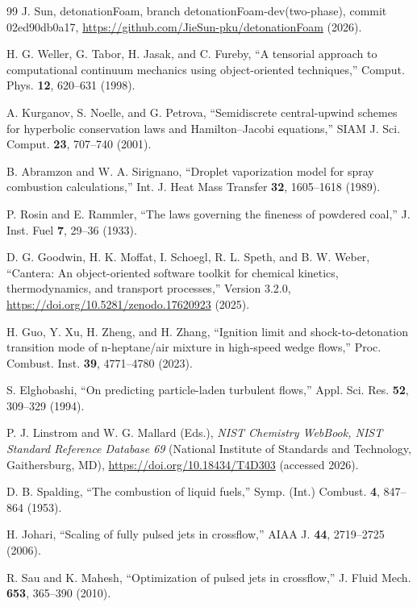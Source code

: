 \documentclass[aip,pof,preprint,amsmath,amssymb]{revtex4-2}
\begin{document}
\begin{thebibliography}{99}
 J. Sun, detonationFoam, branch detonationFoam-dev(two-phase), commit 02ed90db0a17, \url{https://github.com/JieSun-pku/detonationFoam} (2026).

 H. G. Weller, G. Tabor, H. Jasak, and C. Fureby, ``A tensorial approach to computational continuum mechanics using object-oriented techniques,'' Comput. Phys. \textbf{12}, 620--631 (1998).

 A. Kurganov, S. Noelle, and G. Petrova, ``Semidiscrete central-upwind schemes for hyperbolic conservation laws and Hamilton--Jacobi equations,'' SIAM J. Sci. Comput. \textbf{23}, 707--740 (2001).

 B. Abramzon and W. A. Sirignano, ``Droplet vaporization model for spray combustion calculations,'' Int. J. Heat Mass Transfer \textbf{32}, 1605--1618 (1989).

 P. Rosin and E. Rammler, ``The laws governing the fineness of powdered coal,'' J. Inst. Fuel \textbf{7}, 29--36 (1933).

 D. G. Goodwin, H. K. Moffat, I. Schoegl, R. L. Speth, and B. W. Weber, ``Cantera: An object-oriented software toolkit for chemical kinetics, thermodynamics, and transport processes,'' Version 3.2.0, \url{https://doi.org/10.5281/zenodo.17620923} (2025).

 H. Guo, Y. Xu, H. Zheng, and H. Zhang, ``Ignition limit and shock-to-detonation transition mode of n-heptane/air mixture in high-speed wedge flows,'' Proc. Combust. Inst. \textbf{39}, 4771--4780 (2023).

 S. Elghobashi, ``On predicting particle-laden turbulent flows,'' Appl. Sci. Res. \textbf{52}, 309--329 (1994).

 P. J. Linstrom and W. G. Mallard (Eds.), \textit{NIST Chemistry WebBook, NIST Standard Reference Database 69} (National Institute of Standards and Technology, Gaithersburg, MD), \url{https://doi.org/10.18434/T4D303} (accessed 2026).

 D. B. Spalding, ``The combustion of liquid fuels,'' Symp. (Int.) Combust. \textbf{4}, 847--864 (1953).

 H. Johari, ``Scaling of fully pulsed jets in crossflow,'' AIAA J. \textbf{44}, 2719--2725 (2006).

 R. Sau and K. Mahesh, ``Optimization of pulsed jets in crossflow,'' J. Fluid Mech. \textbf{653}, 365--390 (2010).


\end{thebibliography}
\end{document}
